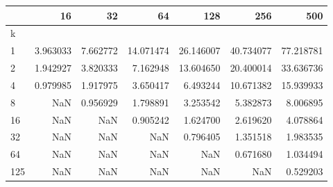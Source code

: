 \begin{tabular}{lrrrrrr}
\toprule
{} &       16  &       32  &        64  &        128 &        256 &        500 \\
\midrule
k   &           &           &            &            &            &            \\
1   &  3.963033 &  7.662772 &  14.071474 &  26.146007 &  40.734077 &  77.218781 \\
2   &  1.942927 &  3.820333 &   7.162948 &  13.604650 &  20.400014 &  33.636736 \\
4   &  0.979985 &  1.917975 &   3.650417 &   6.493244 &  10.671382 &  15.939933 \\
8   &       NaN &  0.956929 &   1.798891 &   3.253542 &   5.382873 &   8.006895 \\
16  &       NaN &       NaN &   0.905242 &   1.624700 &   2.619620 &   4.078864 \\
32  &       NaN &       NaN &        NaN &   0.796405 &   1.351518 &   1.983535 \\
64  &       NaN &       NaN &        NaN &        NaN &   0.671680 &   1.034494 \\
125 &       NaN &       NaN &        NaN &        NaN &        NaN &   0.529203 \\
\bottomrule
\end{tabular}

